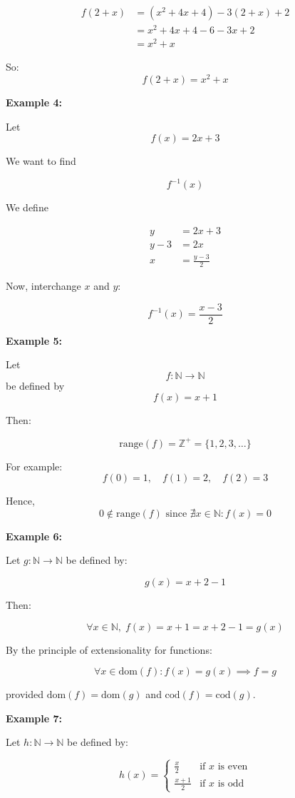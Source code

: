 \documentclass[12pt,a4paper,openany]{article}
\begin{document}
\begin{align*}
f(2 + x) &= (x^2 + 4x + 4) - 3(2 + x) + 2 \\
&= x^2 + 4x + 4 - 6 - 3x + 2 \\
&= x^2 + x
\end{align*}

So:
\[
\boxed{f(2 + x) = x^2 + x}
\]

\textbf{Example 4:}

Let
\[
f(x) = 2x + 3
\]

We want to find

\[
f^{-1}(x)
\]

We define

\begin{align*}
y &= 2x + 3 \\
y - 3 &= 2x \\
x &= \frac{y - 3}{2}
\end{align*}

Now, interchange $x$ and $y$:

\[
\boxed{f^{-1}(x) = \frac{x - 3}{2}}
\]

\textbf{Example 5:}

Let 
\[
f : \mathbb{N} \to \mathbb{N}
\]
be defined by
\[
f(x) = x + 1
\]

Then:

\[
\text{range}(f) = \mathbb{Z}^+ = \{1, 2, 3, \ldots\}
\]

For example:
\[
f(0) = 1, \quad f(1) = 2, \quad f(2) = 3
\]

Hence,
\[
0 \notin \text{range}(f) \text{ since } \nexists x \in \mathbb{N} : f(x) = 0
\]

\textbf{Example 6:}

Let $g : \mathbb{N} \to \mathbb{N}$ be defined by:

\[
g(x) = x + 2 - 1
\]

Then:

\[
\forall x \in \mathbb{N}, \; f(x) = x + 1 = x + 2 - 1 = g(x)
\]

By the principle of extensionality for functions:

\[
\forall x \in \text{dom}(f) : f(x) = g(x) \implies f = g
\]

provided $\text{dom}(f) = \text{dom}(g)$ and $\text{cod}(f) = \text{cod}(g)$.

\textbf{Example 7:}

Let $h : \mathbb{N} \to \mathbb{N}$ be defined by:

\[
h(x) = \begin{cases}
\frac{x}{2} & \text{if } x \text{ is even} \\[0.5em]
\frac{x + 1}{2} & \text{if } x \text{ is odd}
\end{cases}
\]
\end{document}
